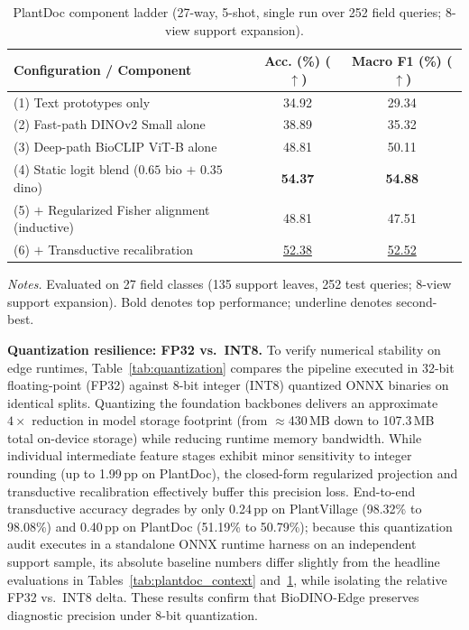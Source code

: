 \begin{table}[htbp]
\caption{PlantDoc component ladder (27-way, 5-shot, single run over 252 field queries; 8-view support expansion).}
\label{tab:plantdoc_ablation}
\centering

\footnotesize
\setlength{\tabcolsep}{3pt}
\begin{tabular*}{\columnwidth}{@{\extracolsep{\fill}}lcc}
\toprule
\textbf{Configuration / Component} & \textbf{Acc. (\%) ($\uparrow$)} & \textbf{Macro F1 (\%) ($\uparrow$)} \\
\midrule
(1) Text prototypes only & 34.92 & 29.34 \\
(2) Fast-path DINOv2 Small alone & 38.89 & 35.32 \\
(3) Deep-path BioCLIP ViT-B alone & 48.81 & 50.11 \\
(4) Static logit blend ($0.65$ bio $+$ $0.35$ dino) & \textbf{54.37} & \textbf{54.88} \\
(5) $+$ Regularized Fisher alignment (inductive) & 48.81 & 47.51 \\
(6) $+$ Transductive recalibration & \underline{52.38} & \underline{52.52} \\
\bottomrule
\end{tabular*}

\vspace{3pt}
\begin{minipage}{\columnwidth}
\footnotesize
\textit{Notes.} Evaluated on 27 field classes (135 support leaves, 252 test queries; 8-view support expansion). Bold denotes top performance; underline denotes second-best.
\end{minipage}
\end{table}

\textbf{Quantization resilience: FP32 vs.\ INT8.} To verify numerical stability on edge runtimes, Table~\ref{tab:quantization} compares the pipeline executed in 32-bit floating-point (FP32) against 8-bit integer (INT8) quantized ONNX binaries on identical splits. Quantizing the foundation backbones delivers an approximate $4\times$ reduction in model storage footprint (from $\approx$430\,MB down to 107.3\,MB total on-device storage) while reducing runtime memory bandwidth. While individual intermediate feature stages exhibit minor sensitivity to integer rounding (up to 1.99\,pp on PlantDoc), the closed-form regularized projection and transductive recalibration effectively buffer this precision loss. End-to-end transductive accuracy degrades by only 0.24\,pp on PlantVillage (98.32\% to 98.08\%) and 0.40\,pp on PlantDoc (51.19\% to 50.79\%); because this quantization audit executes in a standalone ONNX runtime harness on an independent support sample, its absolute baseline numbers differ slightly from the headline evaluations in Tables~\ref{tab:plantdoc_context} and~\ref{tab:plantdoc_ablation}, while isolating the relative FP32 vs.\ INT8 delta. These results confirm that BioDINO-Edge preserves diagnostic precision under 8-bit quantization.

